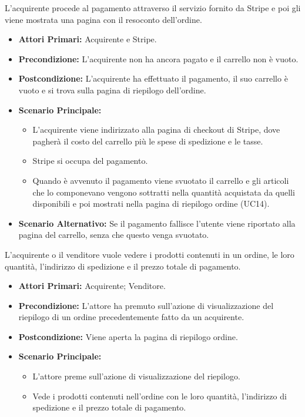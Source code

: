 L'acquirente procede al pagamento attraverso il servizio fornito da Stripe e poi gli viene mostrata una pagina con il resoconto dell'ordine.
\begin{itemize}
    \item \textbf{Attori Primari:} Acquirente e Stripe.
    \item \textbf{Precondizione:} L'acquirente non ha ancora pagato e il carrello non è vuoto.
    \item \textbf{Postcondizione:} L'acquirente ha effettuato il pagamento, il suo carrello è vuoto e si trova sulla pagina di riepilogo dell'ordine.
    \item \textbf{Scenario Principale:}
        \begin{itemize}
            \item L'acquirente viene indirizzato alla pagina di checkout di Stripe, dove pagherà il costo del carrello più le spese di spedizione e le tasse.
            \item Stripe si occupa del pagamento.
            \item Quando è avvenuto il pagamento viene svuotato il carrello e gli articoli che lo componevano vengono sottratti nella quantità acquistata da quelli disponibili e poi mostrati nella pagina di riepilogo ordine (UC14).
        \end{itemize}
    \item \textbf{Scenario Alternativo:} Se il pagamento fallisce l'utente viene riportato alla pagina del carrello, senza che questo venga svuotato.
\end{itemize}

L'acquirente o il venditore vuole vedere i prodotti contenuti in un ordine, le loro quantità, l'indirizzo di spedizione e il prezzo totale di pagamento.
\begin{itemize}
    \item \textbf{Attori Primari:} Acquirente; Venditore.
    \item \textbf{Precondizione:} L'attore ha premuto sull'azione di visualizzazione del riepilogo di un ordine precedentemente fatto da un acquirente. 
    \item \textbf{Postcondizione:} Viene aperta la pagina di riepilogo ordine.
    \item \textbf{Scenario Principale:}
    \begin{itemize}
        \item L'attore preme sull'azione di visualizzazione del riepilogo.
        \item Vede i prodotti contenuti nell'ordine con le loro quantità, l'indirizzo di spedizione e il prezzo totale di pagamento.
    \end{itemize}
\end{itemize}
